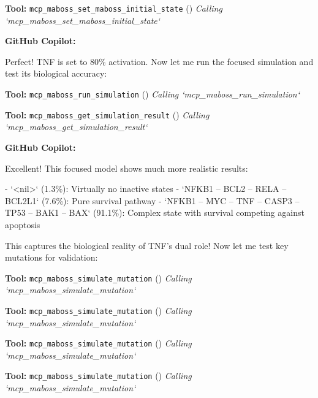 \documentclass[11pt,a4paper]{article}
\begin{document}
\begin{toolokbox}
\textbf{Tool:} \texttt{mcp\_maboss\_set\_maboss\_initial\_state} (\checkmark)
\textit{Calling `mcp\_maboss\_set\_maboss\_initial\_state`}
\end{toolokbox}
\begin{copilotbox}
\textbf{GitHub Copilot:}

Perfect! TNF is set to 80\% activation. Now let me run the focused simulation and test its biological accuracy:

\end{copilotbox}
\begin{toolokbox}
\textbf{Tool:} \texttt{mcp\_maboss\_run\_simulation} (\checkmark)
\textit{Calling `mcp\_maboss\_run\_simulation`}
\end{toolokbox}
\begin{toolokbox}
\textbf{Tool:} \texttt{mcp\_maboss\_get\_simulation\_result} (\checkmark)
\textit{Calling `mcp\_maboss\_get\_simulation\_result`}
\end{toolokbox}
\begin{copilotbox}
\textbf{GitHub Copilot:}

Excellent! This focused model shows much more realistic results:

- `<nil>` (1.3\%): Virtually no inactive states
- `NFKB1 -- BCL2 -- RELA -- BCL2L1` (7.6\%): Pure survival pathway  
- `NFKB1 -- MYC -- TNF -- CASP3 -- TP53 -- BAK1 -- BAX` (91.1\%): Complex state with survival competing against apoptosis

This captures the biological reality of TNF's dual role! Now let me test key mutations for validation:

\end{copilotbox}
\begin{toolokbox}
\textbf{Tool:} \texttt{mcp\_maboss\_simulate\_mutation} (\checkmark)
\textit{Calling `mcp\_maboss\_simulate\_mutation`}
\end{toolokbox}
\begin{toolokbox}
\textbf{Tool:} \texttt{mcp\_maboss\_simulate\_mutation} (\checkmark)
\textit{Calling `mcp\_maboss\_simulate\_mutation`}
\end{toolokbox}
\begin{toolokbox}
\textbf{Tool:} \texttt{mcp\_maboss\_simulate\_mutation} (\checkmark)
\textit{Calling `mcp\_maboss\_simulate\_mutation`}
\end{toolokbox}
\begin{toolokbox}
\textbf{Tool:} \texttt{mcp\_maboss\_simulate\_mutation} (\checkmark)
\textit{Calling `mcp\_maboss\_simulate\_mutation`}
\end{toolokbox}
\end{document}

